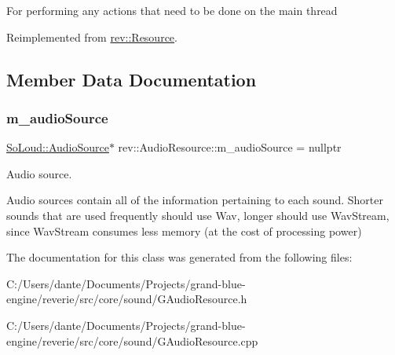 For performing any actions that need to be done on the main thread 

Reimplemented from \mbox{\hyperlink{classrev_1_1_resource_a8a6daa71820d88c86bc6c0aa474d1af7}{rev\+::\+Resource}}.



\subsection{Member Data Documentation}
\mbox{\label{classrev_1_1_audio_resource_a072498f4a94de263c6ce3b2dc9e2d37c}} 
\subsubsection{\texorpdfstring{m\_audioSource}{m\_audioSource}}
{\footnotesize\ttfamily \mbox{\hyperlink{class_so_loud_1_1_audio_source}{So\+Loud\+::\+Audio\+Source}}$\ast$ rev\+::\+Audio\+Resource\+::m\+\_\+audio\+Source = nullptr\hspace{0.3cm}{\ttfamily [protected]}}



Audio source. 

Audio sources contain all of the information pertaining to each sound. Shorter sounds that are used frequently should use Wav, longer should use Wav\+Stream, since Wav\+Stream consumes less memory (at the cost of processing power) 

The documentation for this class was generated from the following files\+:\begin{DoxyCompactItemize}
\item 
C\+:/\+Users/dante/\+Documents/\+Projects/grand-\/blue-\/engine/reverie/src/core/sound/G\+Audio\+Resource.\+h\item 
C\+:/\+Users/dante/\+Documents/\+Projects/grand-\/blue-\/engine/reverie/src/core/sound/G\+Audio\+Resource.\+cpp\end{DoxyCompactItemize}
